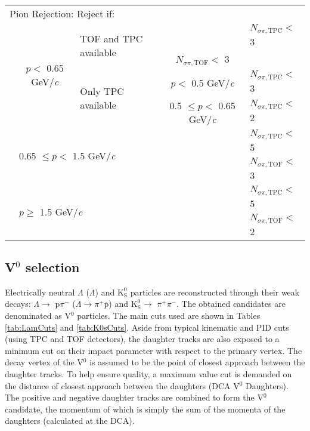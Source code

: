 \documentclass[ALICE,manyauthors]{cernphprep}
\newcommand{\Lam}{$\Lambda$\xspace}
\newcommand{\ALam}{$\overline{\Lambda}$\xspace}
\newcommand{\LamALam}{$\Lambda$ ($\overline{\Lambda}$)\xspace}
\newcommand{\Kpm}{$\mathrm{K^{\pm}}$\xspace}
\newcommand{\Ks}{$\mathrm{K^{0}_{S}}$\xspace}
\newcommand{\Vz}{V$^{0}$\xspace}
\begin{document}
\begin{table}[htbp]
\begin{tabular}{lcc|c|l}
   \multicolumn{5}{l}{Pion Rejection:  Reject if:} \\
   \cline{2-5}
   \multirow{4}{*}{} & \multirow{4}{*}{$p <$ 0.65 GeV/\textit{c}} & \multicolumn{1}{l}{\multirow{2}{*}{TOF and TPC available}} & \multicolumn{1}{c|}{} & $N_{\sigma \pi,\mathrm{TPC}} <$ 3 \\
   \multicolumn{4}{c|}{} & $N_{\sigma \pi,\mathrm{TOF}} <$ 3 \\
   \cline{3-5}
   \multicolumn{2}{c}{} & \multicolumn{1}{l|}{\multirow{2}{*}{Only TPC available}} & $p <$ 0.5 GeV/\textit{c} & $N_{\sigma \pi,\mathrm{TPC}} <$ 3 \\
   \cline{4-5}
   \multicolumn{3}{c|}{} & 0.5 $\leq p <$ 0.65 GeV/\textit{c} & $N_{\sigma \pi,\mathrm{TPC}} <$ 2 \\
   \cline{2-5}
    & \multicolumn{3}{l|}{\multirow{2}{*}{0.65 $\leq p <$ 1.5 GeV/\textit{c}}} & $N_{\sigma \pi,\mathrm{TPC}} <$ 5 \\
    \multicolumn{4}{c|}{} & $N_{\sigma \pi,\mathrm{TOF}} <$ 3 \\
   \cline{2-5}
    & \multicolumn{3}{l|}{\multirow{2}{*}{$p \geq$ 1.5 GeV/\textit{c}}} & $N_{\sigma \pi,\mathrm{TPC}} <$ 5 \\
    \multicolumn{4}{c|}{} & $N_{\sigma \pi,\mathrm{TOF}} <$ 2 \\
   \hline
  \end{tabular}
 \label{tab:KchCuts} 
\end{table}


\subsection{\Vz selection}
\label{sec:V0Selection}

Electrically neutral \LamALam and \Ks particles are reconstructed through their weak decays: \Lam $\rightarrow$ p$\pi^{-}$ (\ALam $\rightarrow \pi^{+}\overline{\mathrm{p}}$) and \Ks $\rightarrow$ $\pi^{+}\pi^{-}$.
The obtained candidates are denominated as \Vz particles.
The main cuts used are shown in Tables \ref{tab:LamCuts} and \ref{tab:K0sCuts}.
Aside from typical kinematic and PID cuts (using TPC and TOF detectors), the daughter tracks are also exposed to a minimum cut on their impact parameter with respect to the primary vertex.  
The decay vertex of the \Vz is assumed to be the point of closest approach between the daughter tracks.
To help ensure quality, a maximum value cut is demanded on the distance of closest approach between the daughters (DCA \Vz Daughters).
The positive and negative daughter tracks are combined to form the \Vz candidate, the momentum of which is simply the sum of the momenta of the daughters (calculated at the DCA).
\end{document}
